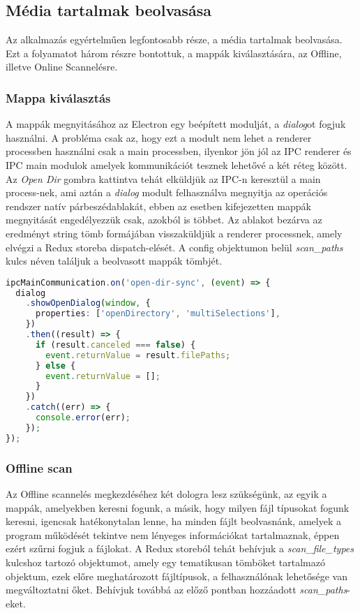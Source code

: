 \cleardoublepage
\subsection{Média tartalmak beolvasása}
Az alkalmazás egyértelműen legfontosabb része, a média tartalmak beolvasása. Ezt a folyamatot három részre bontottuk, a mappák kiválasztására, az Offline, illetve Online Scannelésre.

\subsubsection{Mappa kiválasztás}
A mappák megnyitásához az Electron egy beépített modulját, a {\it dialog}ot fogjuk használni. A probléma csak az, hogy ezt a modult nem lehet a renderer processben használni csak a main processben, ilyenkor jön jól az IPC renderer és IPC main modulok amelyek kommunikációt tesznek lehetővé a két réteg között. Az {\it Open Dir} gombra kattintva tehát elküldjük az IPC-n keresztül a main process-nek, ami aztán a {\it dialog} modult felhasználva megnyitja az operációs rendszer natív párbeszédablakát, ebben az esetben kifejezetten mappák megnyitását engedélyezzük csak, azokból is többet. Az ablakot bezárva az eredményt string tömb formájában visszaküldjük a renderer processnek, amely elvégzi a Redux storeba dispatch-elését. A config objektumon belül {\it scan\_paths} kulcs néven találjuk a beolvasott mappák tömbjét.

\begin{lstlisting}[language={ts}]
ipcMainCommunication.on('open-dir-sync', (event) => {
  dialog
    .showOpenDialog(window, {
      properties: ['openDirectory', 'multiSelections'],
    })
    .then((result) => {
      if (result.canceled === false) {
        event.returnValue = result.filePaths;
      } else {
        event.returnValue = [];
      }
    })
    .catch((err) => {
      console.error(err);
    });
});
\end{lstlisting}

\subsubsection{Offline scan}
Az Offline scannelés megkezdéséhez két dologra lesz szükségünk, az egyik a mappák, amelyekben keresni fogunk, a másik, hogy milyen fájl típusokat fogunk keresni, igencsak hatékonytalan lenne, ha minden fájlt beolvasnánk, amelyek a program működését tekintve nem lényeges információkat tartalmaznak, éppen ezért szűrni fogjuk a fájlokat. A Redux storeból tehát behívjuk a {\it scan\_file\_types} kulcshoz tartozó objektumot, amely egy tematikusan tömböket tartalmazó objektum, ezek előre meghatározott fájltípusok, a felhasználónak lehetősége van megváltoztatni őket. Behívjuk továbbá az előző pontban hozzáadott {\it scan\_paths}-eket.

